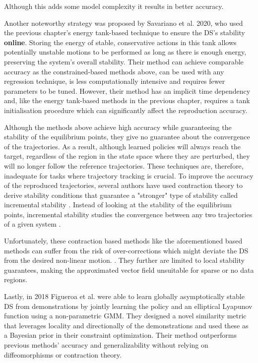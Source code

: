 Although this adds some model complexity it results in better accuracy.



Another noteworthy strategy was proposed by Savariano et al. 2020\cite{saverianoEnergybasedApproachEnsure2020}, who used the previous chapter's energy tank-based technique to ensure the DS's stability \textbf{online}. Storing the energy of stable, conservative actions in this tank allows potentially unstable motions to be performed as long as there is enough energy, preserving the system's overall stability. Their method can achieve comparable accuracy as the constrained-based methods above, can be used with any regression technique, is less computationally intensive and requires fewer parameters to be tuned. However, their method has an implicit time dependency and, like the energy tank-based methods in the previous chapter, requires a tank initialisation procedure which can significantly affect the reproduction accuracy.

Although the methods above achieve high accuracy while guaranteeing the stability of the equilibrium points, they give no guarantee about the convergence of the trajectories. As a result, although learned policies will always reach the target, regardless of the region in the state space where they are perturbed, they will no longer follow the reference trajectories. These techniques are, therefore, inadequate for tasks where trajectory tracking is crucial. To improve the accuracy of the reproduced trajectories, several authors have used contraction theory to derive stability conditions that guarantee a "stronger" type of stability called incremental stability \cite{ravichandarLearningContractingNonlinear2016,blocherLearningStableDynamical2017}. Instead of looking at the stability of the equilibrium points, incremental stability studies the convergence between any two trajectories of a given system \cite{lohmillerContractionAnalysisNonlinear1998}. 

Unfortunately, these contraction based methods like the aforementioned based methods can suffer from the risk of over-corrections which might deviate the DS from the desired non-linear motion. \cite{figueroafernandezPhysicallyconsistentBayesianNonparametric2018}. They further are limited to local stability guarantees, making the approximated vector field unsuitable for sparse or no data regions.

Lastly, in 2018 Figueroa et al. \cite{figueroafernandezPhysicallyconsistentBayesianNonparametric2018} were able to learn globally asymptotically stable DS from demonstrations by jointly learning the policy and an elliptical Lyapunov function using a non-parametric GMM. They designed a novel similarity metric that leverages locality and directionally of the demonstrations and used these as a Bayesian prior in their constraint optimization. Their method outperforms previous methods' accuracy and generalizability without relying on diffeomorphisms or contraction theory.

